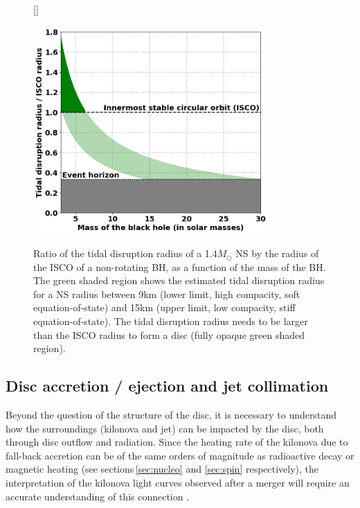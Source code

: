 \documentclass[11pt,onecolumn]{article}
\makeatletter
\newcommand*{\ns}{NS\@\xspace}
\newcommand*{\bh}{BH\@\xspace}
\newcommand*{\msun}{$M_{\odot}$\@\xspace}
\makeatother
\begin{document}
\begin{figure}[!h]
\vspace*{-0.2cm}
[\FBwidth]
{\caption{Ratio of the tidal disruption radius of a 1.4\msun \ns by the radius of the ISCO of a non-rotating \bh, as a function of the mass of the \bh. The green shaded region shows the estimated tidal disruption radius for a \ns radius between 9km (lower limit, high compacity, soft equation-of-state) and 15km (upper limit, low compacity, stiff equation-of-state). The tidal disruption radius needs to be larger than the ISCO radius to form a disc (fully opaque green shaded region).}\label{fig:disc_condition}}
{\includegraphics[width=9cm]{Figures/tidal_disruption_radius.png}}
\end{figure}

\subsection{Disc accretion / ejection and jet collimation}
\label{sec:acc-ej}

Beyond the question of the structure of the disc, it is necessary to understand how the surroundings (kilonova and jet) can be impacted by the disc, both through disc outflow and radiation. Since the heating rate of the kilonova due to fall-back accretion \citep{Rosswog2007} can be of the same orders of magnitude as radioactive decay or magnetic heating (see sections\,\ref{sec:nucleo} and \ref{sec:spin} respectively), the interpretation of the kilonova light curves observed after a merger will require an accurate understanding of this connection .\\
\end{document}
